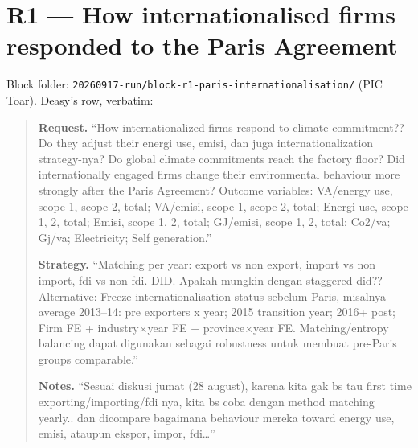 \section{R1 --- How internationalised firms responded to the Paris Agreement}

{\footnotesize\color{soft}Block folder: \texttt{20260917-run/block-r1-paris-internationalisation/} (PIC Toar). Deasy's row, verbatim:}
\begin{quote}\footnotesize
\textbf{Request.} ``How internationalized firms respond to climate commitment?? Do they adjust their energi use, emisi, dan juga
internationalization strategy-nya? Do global climate commitments reach the factory floor? Did internationally engaged firms
change their environmental behaviour more strongly after the Paris Agreement? Outcome variables: VA/energy use, scope 1, scope 2,
total; VA/emisi, scope 1, scope 2, total; Energi use, scope 1, 2, total; Emisi, scope 1, 2, total; GJ/emisi, scope 1, 2, total;
Co2/va; Gj/va; Electricity; Self generation.''\par
\textbf{Strategy.} ``Matching per year: export vs non export, import vs non import, fdi vs non fdi. DID. Apakah mungkin dengan
staggered did?? Alternative: Freeze internationalisation status sebelum Paris, misalnya average 2013--14: pre exporters x year;
2015 transition year; 2016+ post; Firm FE + industry$\times$year FE + province$\times$year FE. Matching/entropy balancing dapat
digunakan sebagai robustness untuk membuat pre-Paris groups comparable.''\par
\textbf{Notes.} ``Sesuai diskusi jumat (28 august), karena kita gak bs tau first time exporting/importing/fdi nya, kita bs coba
dengan method matching yearly.. dan dicompare bagaimana behaviour mereka toward energy use, emisi, ataupun ekspor, impor, fdi\ldots''
\end{quote}

